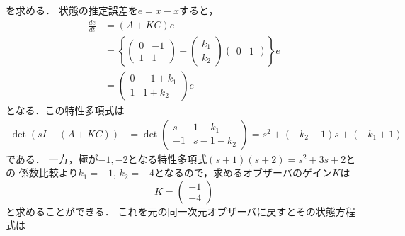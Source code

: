 を求める．
状態の推定誤差を$e = x - \hat{x}$すると，
\begin{align}
 \frac{de}{dt}
 &= (A+KC) e
 \nonumber \\
 &=
 \left\{
 \left(
 \begin{array}{cc}
  0 & -1 \\
  1 & 1
 \end{array}
 \right)
 + 
 \left( 
 \begin{array}{c}
  k_1 \\
  k_2
 \end{array}
 \right)
 \left(
 \begin{array}{cc}
  0 & 1
 \end{array}
 \right)
 \right\} e
\nonumber \\
 &=
 \left(
 \begin{array}{cc}
  0 & -1 +k_1\\
  1 & 1 + k_2
 \end{array}
 \right)  e
\end{align}
となる．この特性多項式は
\begin{align}
 \det (sI-(A+KC))
 &=\det 
  \left(
  \begin{array}{cc}
   s & 1 -k_1\\
   -1 & s-1 - k_2
  \end{array}
  \right)
 = s^2 + (-k_2 - 1)s + (-k_1 + 1)
\end{align}
である．
一方，極が$-1, -2$となる特性多項式$(s+1)(s+2) = s^2 + 3s + 2$との
係数比較より$k_1 = -1$, $k_2 = -4$となるので，求めるオブザーバのゲイン$K$は
\[
 K = 
 \left(
 \begin{array}{c}
  -1 \\
  -4
 \end{array}
 \right)
\]
と求めることができる．
これを元の同一次元オブザーバに戻すとその状態方程式は
